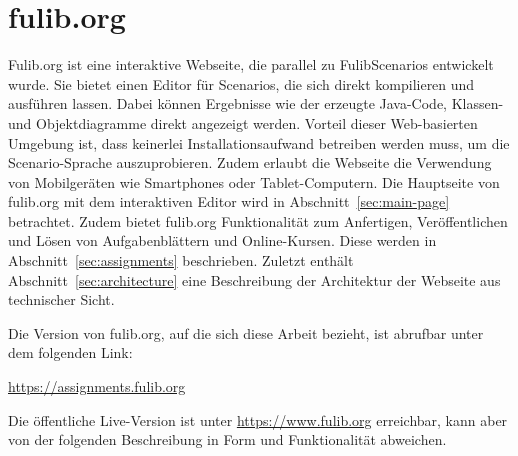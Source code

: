 \chapter{fulib.org}\label{ch:fulib.org}

Fulib.org ist eine interaktive Webseite, die parallel zu FulibScenarios entwickelt wurde.
Sie bietet einen Editor für Scenarios, die sich direkt kompilieren und ausführen lassen.
Dabei können Ergebnisse wie der erzeugte Java-Code, Klassen- und Objektdiagramme direkt angezeigt werden.
Vorteil dieser Web-basierten Umgebung ist, dass keinerlei Installationsaufwand betreiben werden muss, um die Scenario-Sprache auszuprobieren.
Zudem erlaubt die Webseite die Verwendung von Mobilgeräten wie Smartphones oder Tablet-Computern.
Die Hauptseite von fulib.org mit dem interaktiven Editor wird in Abschnitt~\ref{sec:main-page} betrachtet.
Zudem bietet fulib.org Funktionalität zum Anfertigen, Veröffentlichen und Lösen von Aufgabenblättern und Online-Kursen.
Diese werden in Abschnitt~\ref{sec:assignments} beschrieben.
Zuletzt enthält Abschnitt~\ref{sec:architecture} eine Beschreibung der Architektur der Webseite aus technischer Sicht.

Die Version von fulib.org, auf die sich diese Arbeit bezieht, ist abrufbar unter dem folgenden Link:

\begin{center}
    \url{https://assignments.fulib.org}
\end{center}

Die öffentliche Live-Version ist unter \url{https://www.fulib.org} erreichbar, kann aber von der folgenden Beschreibung in Form und Funktionalität abweichen.




